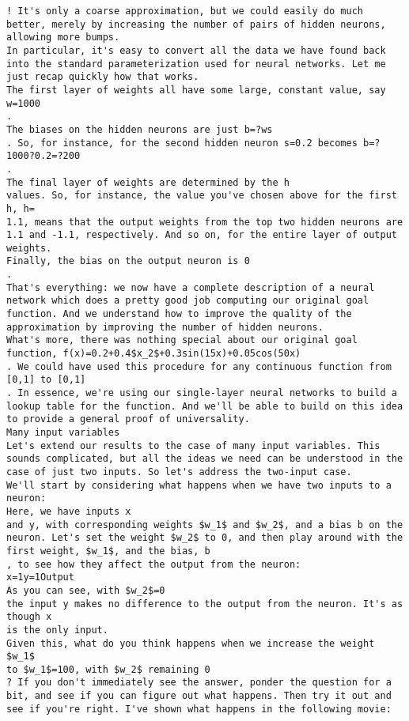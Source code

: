 \begin{lstlisting}
! It's only a coarse approximation, but we could easily do much better, merely by increasing the number of pairs of hidden neurons, allowing more bumps.
In particular, it's easy to convert all the data we have found back into the standard parameterization used for neural networks. Let me just recap quickly how that works.
The first layer of weights all have some large, constant value, say w=1000
.
The biases on the hidden neurons are just b=?ws
. So, for instance, for the second hidden neuron s=0.2 becomes b=?1000?0.2=?200
.
The final layer of weights are determined by the h
values. So, for instance, the value you've chosen above for the first h, h=
1.1, means that the output weights from the top two hidden neurons are 1.1 and -1.1, respectively. And so on, for the entire layer of output weights.
Finally, the bias on the output neuron is 0
.
That's everything: we now have a complete description of a neural network which does a pretty good job computing our original goal function. And we understand how to improve the quality of the approximation by improving the number of hidden neurons.
What's more, there was nothing special about our original goal function, f(x)=0.2+0.4$x_2$+0.3sin(15x)+0.05cos(50x)
. We could have used this procedure for any continuous function from [0,1] to [0,1]
. In essence, we're using our single-layer neural networks to build a lookup table for the function. And we'll be able to build on this idea to provide a general proof of universality.
Many input variables
Let's extend our results to the case of many input variables. This sounds complicated, but all the ideas we need can be understood in the case of just two inputs. So let's address the two-input case.
We'll start by considering what happens when we have two inputs to a neuron:
Here, we have inputs x
and y, with corresponding weights $w_1$ and $w_2$, and a bias b on the neuron. Let's set the weight $w_2$ to 0, and then play around with the first weight, $w_1$, and the bias, b
, to see how they affect the output from the neuron:
x=1y=1Output
As you can see, with $w_2$=0
the input y makes no difference to the output from the neuron. It's as though x
is the only input.
Given this, what do you think happens when we increase the weight $w_1$
to $w_1$=100, with $w_2$ remaining 0
? If you don't immediately see the answer, ponder the question for a bit, and see if you can figure out what happens. Then try it out and see if you're right. I've shown what happens in the following movie:


\end{lstlisting}
